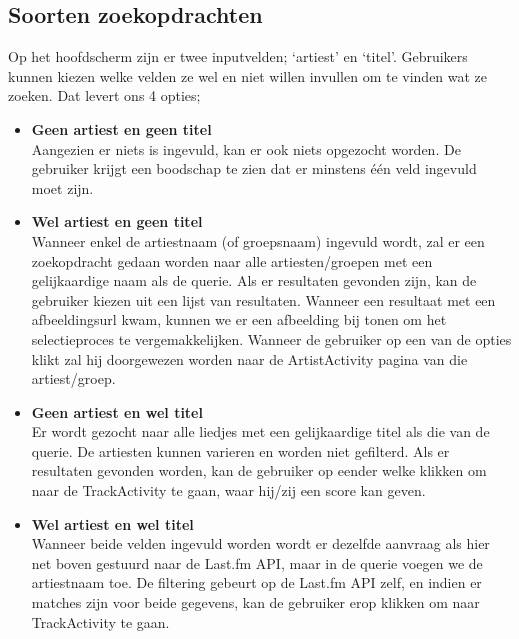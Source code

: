 \documentclass[11pt,a4paper]{article}
\begin{document}
	\subsection{Soorten zoekopdrachten}
	\label{sec:Verschillende zoekopdrachten}
	Op het hoofdscherm zijn er twee inputvelden; `artiest' en `titel'. Gebruikers kunnen kiezen welke velden ze wel en niet willen invullen om te vinden wat ze zoeken. Dat levert ons 4 opties;
		\begin{itemize}
			\item \textbf{Geen artiest en geen titel} \\
		Aangezien er niets is ingevuld, kan er ook niets opgezocht worden. De gebruiker krijgt een boodschap te zien dat er minstens één veld ingevuld moet zijn. \\
		
			\item \textbf{Wel artiest en geen titel} \\
		Wanneer enkel de artiestnaam (of groepsnaam) ingevuld wordt, zal er een zoekopdracht gedaan worden naar alle artiesten/groepen met een gelijkaardige naam als de querie. Als er resultaten gevonden zijn, kan de gebruiker kiezen uit een lijst van resultaten. Wanneer een resultaat met een afbeeldingsurl kwam, kunnen we er een afbeelding bij tonen om het selectieproces te vergemakkelijken. Wanneer de gebruiker op een van de opties klikt zal hij doorgewezen worden naar de ArtistActivity pagina van die artiest/groep. \\
		
			\item  \textbf{Geen artiest en wel titel} \\
		Er wordt gezocht naar alle liedjes met een gelijkaardige titel als die van de querie. De artiesten kunnen varieren en worden niet gefilterd. Als er resultaten gevonden worden, kan de gebruiker op eender welke klikken om naar de TrackActivity te gaan, waar hij/zij een score kan geven.\\
				
			\item  \textbf{Wel artiest en wel titel} \\
		Wanneer beide velden ingevuld worden wordt er dezelfde aanvraag als hier net boven gestuurd naar de Last.fm API, maar in de querie voegen we de artiestnaam toe. De filtering gebeurt op de Last.fm API zelf, en indien er matches zijn voor beide gegevens, kan de gebruiker erop klikken om naar TrackActivity te gaan.
		\end{itemize}
		
\end{document}

